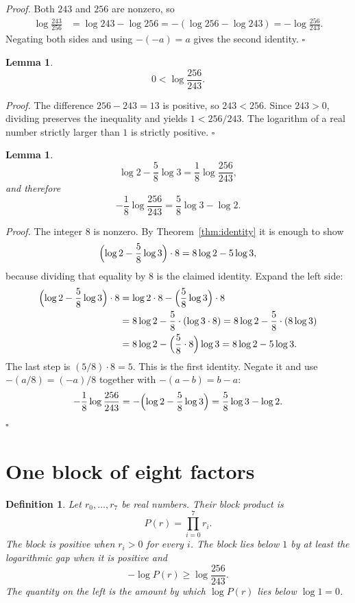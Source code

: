 \documentclass[11pt,letterpaper]{article}
\newtheorem{lemma}[theorem]{Lemma}
\newtheorem{definition}[theorem]{Definition}
\newenvironment{proof}{\noindent\textit{Proof.}}{\hfill\(\square\)}
\begin{document}
\begin{proof}
Both \(243\) and \(256\) are nonzero, so
\begin{align*}
\log\frac{243}{256}
&=\log 243-\log 256
=-(\log 256-\log 243)
=-\log\frac{256}{243}.
\end{align*}
Negating both sides and using \(-(-a)=a\) gives the second identity.
\end{proof}

\begin{lemma}
\label{lem:positive}
\[
0<\log\frac{256}{243}.
\]
\end{lemma}

\begin{proof}
The difference \(256-243=13\) is positive, so \(243<256\). Since \(243>0\), dividing preserves the inequality and yields \(1<256/243\). The logarithm of a real number strictly larger than \(1\) is strictly positive.
\end{proof}

\begin{lemma}
\label{lem:step}
\[
\log 2-\frac58\log 3=\frac18\log\frac{256}{243},
\]
and therefore
\[
-\frac18\log\frac{256}{243}=\frac58\log 3-\log 2.
\]
\end{lemma}

\begin{proof}
The integer \(8\) is nonzero. By Theorem~\ref{thm:identity} it is enough to show
\[
\Bigl(\log 2-\frac58\log 3\Bigr)\cdot 8=8\log 2-5\log 3,
\]
because dividing that equality by \(8\) is the claimed identity. Expand the left side:
\begin{align*}
\Bigl(\log 2-\frac58\log 3\Bigr)\cdot 8
&=\log 2\cdot 8-\Bigl(\frac58\log 3\Bigr)\cdot 8\\
&=8\log 2-\frac58\cdot(\log 3\cdot 8)
=8\log 2-\frac58\cdot(8\log 3)\\
&=8\log 2-\Bigl(\frac58\cdot 8\Bigr)\log 3
=8\log 2-5\log 3.
\end{align*}
The last step is \((5/8)\cdot 8=5\). This is the first identity. Negate it and use \(-(a/8)=(-a)/8\) together with \(-(a-b)=b-a\):
\[
-\frac18\log\frac{256}{243}
=-\Bigl(\log 2-\frac58\log 3\Bigr)
=\frac58\log 3-\log 2.
\]
\end{proof}

\section{One block of eight factors}

\begin{definition}
\label{def:block}
Let \(r_0,\ldots,r_7\) be real numbers. Their \emph{block product} is
\[
P(r)=\prod_{i=0}^{7} r_i.
\]
The block is \emph{positive} when \(r_i>0\) for every \(i\). The block lies below \(1\) by at least the logarithmic gap when it is positive and
\[
-\log P(r)\ge\log\frac{256}{243}.
\]
The quantity on the left is the amount by which \(\log P(r)\) lies below \(\log 1=0\).
\end{definition}
\end{document}
